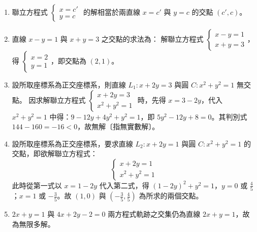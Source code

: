 \begin{example}[例 3]
\begin{enumerate}[label=(\roman*), leftmargin=2em]
  \item 聯立方程式 $\begin{cases} x = c' \\ y = c \end{cases}$ 的解相當於兩直線 $x = c'$ 與 $y = c$ 的交點 $(c', c)$。
  \item 直線 $x - y = 1$ 與 $x + y = 3$ 之交點的求法為：
  解聯立方程式 $\begin{cases} x - y = 1 \\ x + y = 3 \end{cases}$，得 $\begin{cases} x = 2 \\ y = 1 \end{cases}$，即交點為 $(2, 1)$。
  \item 設所取座標系為正交座標系，則直線 $L_1 : x + 2y = 3$ 與圓 $C : x^2 + y^2 = 1$ 無交點。
  因求解聯立方程式 $\begin{cases} x + 2y = 3 \\ x^2 + y^2 = 1 \end{cases}$ 時，先得 $x = 3 - 2y$，代入 $x^2 + y^2 = 1$ 中得：$9 - 12y + 4y^2 + y^2 = 1$，即 $5y^2 - 12y + 8 = 0$。其判別式 $144 - 160 = -16 < 0$，故無解〔指無實數解〕。
  \item 設所取座標系為正交座標系，要求直線 $L_2 : x + 2y = 1$ 與圓 $C : x^2 + y^2 = 1$ 的交點，即欲解聯立方程式：
  \[ \begin{cases} x + 2y = 1 \\ x^2 + y^2 = 1 \end{cases} \]
  此時從第一式以 $x = 1 - 2y$ 代入第二式，得 $(1 - 2y)^2 + y^2 = 1$，$y = 0$ 或 $\frac{4}{5}$；$x = 1$ 或 $-\frac{3}{5}$。故 $(1, 0)$ 與 $(-\frac{3}{5}, \frac{4}{5})$ 為所求的兩個交點。
  \item $2x + y = 1$ 與 $4x + 2y - 2 = 0$ 兩方程式軌跡之交集仍為直線 $2x + y = 1$，故為無限多解。
\end{enumerate}
\end{example}

